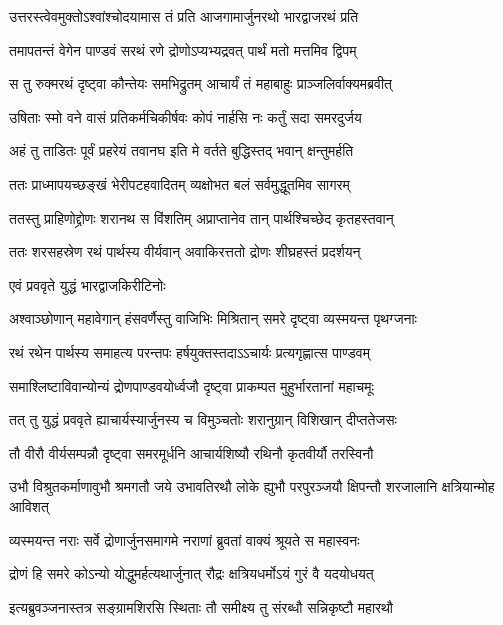 \twolineshloka
{उत्तरस्त्वेवमुक्तोऽश्वांश्चोदयामास तं प्रति}
{आजगामार्जुनरथो भारद्वाजरथं प्रति}


\twolineshloka
{तमापतन्तं वेगेन पाण्डवं सरथं रणे}
{द्रोणोऽप्यभ्यद्रवत् पार्थं मतो मत्तमिव द्विपम्}


\twolineshloka
{स तु रुक्मरथं दृष्ट्वा कौन्तेयः समभिद्रुतम्}
{आचार्यं तं महाबाहुः प्राञ्जलिर्वाक्यमब्रवीत्}


\twolineshloka
{उषिताः स्मो वने वासं प्रतिकर्मचिकीर्षवः}
{कोपं नार्हसि नः कर्तुं सदा समरदुर्जय}


\twolineshloka
{अहं तु ताडितः पूर्वं प्रहरेयं तवानघ}
{इति मे वर्तते बुद्धिस्तद् भवान् क्षन्तुमर्हति}


\twolineshloka
{ततः प्राध्मापयच्छङ्खं भेरीपटहवादितम्}
{व्यक्षोभत बलं सर्वमुद्धूतमिव सागरम्}



\twolineshloka
{ततस्तु प्राहिणोद्द्रोणः शरानथ स विंशतिम्}
{अप्राप्तानेव तान् पार्थश्चिच्छेद कृतहस्तवान्}


\twolineshloka
{ततः शरसहस्रेण रथं पार्थस्य वीर्यवान्}
{अवाकिरत्ततो द्रोणः शीघ्रहस्तं प्रदर्शयन्}


\onelineshloka
{एवं प्रववृते युद्धं भारद्वाजकिरीटिनोः}


\twolineshloka
{अश्वाञ्छोणान् महावेगान् हंसवर्णैस्तु वाजिभिः}
{मिश्रितान् समरे दृष्ट्वा व्यस्मयन्त पृथग्जनाः}


\twolineshloka
{रथं रथेन पार्थस्य समाहत्य परन्तपः}
{हर्षयुक्तस्तदाऽऽचार्यः प्रत्यगृह्णात्स पाण्डवम्}


\twolineshloka
{समाश्लिष्टाविवान्योन्यं द्रोणपाण्डवयोर्ध्वजौ}
{दृष्ट्वा प्राकम्पत मुहुर्भारतानां महाचमूः}


\twolineshloka
{तत् तु युद्धं प्रववृते ह्याचार्यस्यार्जुनस्य च}
{विमुञ्चतोः शरानुग्रान् विशिखान् दीप्ततेजसः}


\twolineshloka
{तौ वीरौ वीर्यसम्पन्नौ दृष्ट्वा समरमूर्धनि}
{आचार्यशिष्यौ रथिनौ कृतवीर्यौ तरस्विनौ}


\threelineshloka
{उभौ विश्रुतकर्माणावुभौ श्रमगतौ जये}
{उभावतिरथौ लोके ह्युभौ परपुरञ्जयौ}
{क्षिपन्तौ शरजालानि क्षत्रियान्मोह आविशत्}


\twolineshloka
{व्यस्मयन्त नराः सर्वे द्रोणार्जुनसमागमे}
{नराणां ब्रुवतां वाक्यं श्रूयते स महास्वनः}


\twolineshloka
{द्रोणं हि समरे कोऽन्यो योद्धुमर्हत्यथार्जुनात्}
{रौद्रः क्षत्रियधर्मोऽयं गुरं वै यदयोधयत्}


\twolineshloka
{इत्यब्रुवञ्जनास्तत्र सङ्ग्रामशिरसि स्थिताः}
{तौ समीक्ष्य तु संरब्धौ सन्निकृष्टौ महारथौ}


